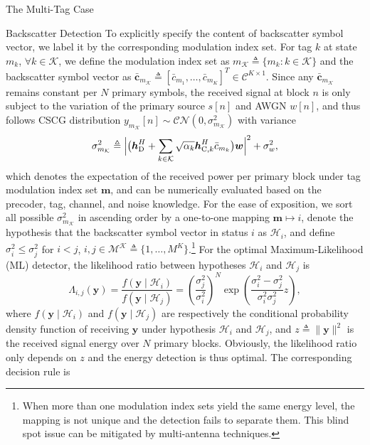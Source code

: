 \documentclass[journal]{IEEEtran}
\begin{document}
\begin{section}{The Multi-Tag Case}
\begin{subsection}{Backscatter Detection}
			To explicitly specify the content of backscatter symbol vector, we label it by the corresponding modulation index set. For tag $k$ at state $m_k$, $\forall k \in \mathcal{K}$, we define the modulation index set as $m_{\mathcal{K}} \triangleq \{m_k \colon k \in \mathcal{K}\}$ and the backscatter symbol vector as $\bar{\boldsymbol{c}}_{m_{\mathcal{K}}} \triangleq [\bar{c}_{m_1},\ldots,\bar{c}_{m_K}]^T \in \mathcal{C}^{K \times 1}$. Since any $\bar{\boldsymbol{c}}_{m_{\mathcal{K}}}$ remains constant per $N$ primary symbols, the received signal at block $n$ is only subject to the variation of the primary source $s[n]$ and AWGN $w[n]$, and thus follows CSCG distribution $y_{m_{\mathcal{K}}}[n] \sim \mathcal{CN}\left(0,\sigma_{m_{\mathcal{K}}}^2\right)$ with variance
			\begin{equation}
				\sigma_{m_{\mathcal{K}}}^2 \triangleq \Bigl\lvert \bigl(\boldsymbol{h}_{\mathrm{D}}^H + \sum_{k \in \mathcal{K}} \sqrt{\alpha_k} \boldsymbol{h}_{\mathrm{C},k}^H \bar{c}_{m_k}\bigr) \boldsymbol{w} \Bigr\rvert^2 + \sigma_w^2,
				\label{eq:receive_variance}
			\end{equation}
			which denotes the expectation of the received power per primary block under tag modulation index set $\boldsymbol{m}$, and can be numerically evaluated based on the precoder, tag, channel, and noise knowledge. For the ease of exposition, we sort all possible $\sigma_{m_{\mathcal{K}}}^2$ in ascending order by a one-to-one mapping $\boldsymbol{m} \mapsto i$, denote the hypothesis that the backscatter symbol vector in status $i$ as $\mathcal{H}_i$, and define $\sigma_i^2 \le \sigma_j^2$ for $i < j$, $i,j \in \mathcal{M^K} \triangleq \{1,\ldots,M^K\}$.\footnote{When more than one modulation index sets yield the same energy level, the mapping is not unique and the detection fails to separate them. This blind spot issue can be mitigated by multi-antenna techniques.} For the optimal Maximum-Likelihood (ML) detector, the likelihood ratio between hypotheses $\mathcal{H}_i$ and $\mathcal{H}_j$ is \cite{Qian2019}
			\begin{equation}
				\Lambda_{i,j}(\boldsymbol{y}) = \frac{f(\boldsymbol{y} \mid \mathcal{H}_i)}{f(\boldsymbol{y} \mid \mathcal{H}_j)} = \left( \frac{\sigma_j^2}{\sigma_i^2} \right)^N \exp \left( \frac{\sigma_i^2 - \sigma_j^2}{\sigma_i^2 \sigma_j^2} z \right),
				\label{eq:likelihood_ratio}
			\end{equation}
			where $f(\boldsymbol{y} \mid \mathcal{H}_i)$ and $f(\boldsymbol{y} \mid \mathcal{H}_j)$ are respectively the conditional probability density function of receiving $\boldsymbol{y}$ under hypothesis $\mathcal{H}_i$ and $\mathcal{H}_j$, and $z \triangleq \lVert \boldsymbol{y} \rVert^2$ is the received signal energy over $N$ primary blocks. Obviously, the likelihood ratio only depends on $z$ and the energy detection is thus optimal. The corresponding decision rule is

\end{subsection}
\end{section}
\end{document}
